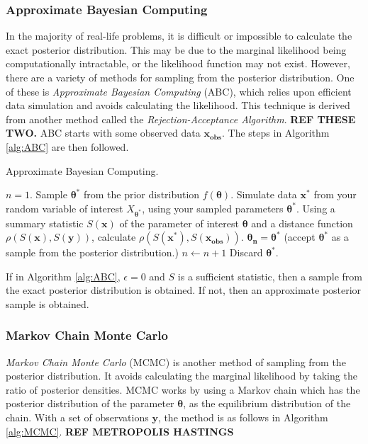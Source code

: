\documentclass[12pt]{article}
\begin{document}
\subsubsection{Approximate Bayesian Computing}\label{sssec:ABC}
In the majority of real-life problems, it is difficult or impossible to calculate the exact posterior distribution. This may be due to the marginal likelihood being computationally intractable, or the likelihood function may not exist. However, there are a variety of methods for sampling from the posterior distribution. One of these is \emph{Approximate Bayesian Computing} (ABC), which relies upon efficient data simulation and avoids calculating the likelihood. This technique is derived from another method called the \emph{Rejection-Acceptance Algorithm}. \textbf{REF THESE TWO.} ABC starts with some observed data $\bm{x_{\text{obs}}}$. The steps in Algorithm \ref{alg:ABC} are then followed.

\begin{algorithm}[h!]
\caption{Approximate Bayesian Computing.}
\label{alg:ABC}
\begin{algorithmic}[1] %
  \STATE $n = 1$.
  \STATE Sample $\bm{\theta^*}$ from the prior distribution $f(\bm{\theta})$.
  \STATE Simulate data $\bm{x^*}$ from your random variable of interest $X_{\bm{\theta^*}}$, using your sampled parameters $\bm{\theta^*}$.
  \STATE Using a summary statistic $S(\bm{x})$ of the parameter of interest $\bm{\theta}$ and a distance function $\rho(S(\bm{x}),S(\bm{y}))$, calculate $\rho(S(\bm{x^*}),S(\bm{x_{\text{obs}}}))$.
        \STATE $\bm{\theta_n}=\bm{\theta^*}$ (accept $\bm{\theta^*}$ as a sample from the posterior distribution.)
        \STATE $n \leftarrow n+1$
        \ELSE
            \STATE Discard  $\bm{\theta^*}$.
        \ENDIF
    \ENDWHILE
\end{algorithmic}
\end{algorithm}
If in Algorithm \ref{alg:ABC}, $\epsilon=0$ and $S$ is a sufficient statistic, then a sample from the exact posterior distribution is obtained. If not, then an approximate posterior sample is obtained.



\subsubsection{Markov Chain Monte Carlo}\label{sssec:MCMC}
\emph{Markov Chain Monte Carlo} (MCMC) is another method of sampling from the posterior distribution. It avoids calculating the marginal likelihood by taking the ratio of posterior densities. MCMC works by using a Markov chain which has the posterior distribution of the parameter $\bm{\theta}$, as the equilibrium distribution of the chain. With a set of observations $\bm{y}$, the method is as follows in Algorithm \ref{alg:MCMC}. \textbf{REF METROPOLIS HASTINGS}
\end{document}
